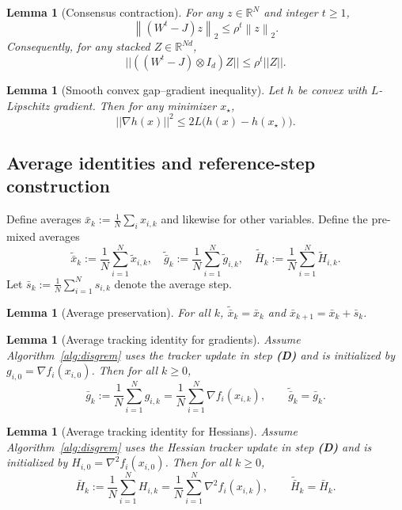 \documentclass[11pt,a4paper]{article}
\def\one{1}%
\def\J{J}%
\def\norm#1{||#1||}%
\newtheorem{lemma}[theorem]{Lemma}
\newcommand{\R}{\mathbb{R}}
\newcommand{\one}{\mathbf{1}}
\newcommand{\norm}[1]{\left\|#1\right\|}
\newcommand{\normtwo}[1]{\left\|#1\right\|_2}
\newcommand{\J}{\left(\frac{1}{N}\one\one^\top\right)}
\begin{document}
\begin{lemma}[Consensus contraction]\label{lem:consensus}
	For any $z\in\R^N$ and integer $t\ge 1$,
	\[
	\normtwo{(W^t-\J)z}\le \rho^t\normtwo{z}.
	\]
	Consequently, for any stacked $Z\in\R^{Nd}$,
	\[
	\norm{((W^t-\J)\otimes I_d)Z}\le \rho^t\norm{Z}.
	\]
\end{lemma}

\begin{lemma}[Smooth convex gap--gradient inequality]\label{lem:gap-grad}
	Let $h$ be convex with $L$-Lipschitz gradient. Then for any minimizer $x_\star$,
	\[
	\norm{\nabla h(x)}^2\le 2L\big(h(x)-h(x_\star)\big).
	\]
\end{lemma}

\subsection{Average identities and reference-step construction}
Define averages $\bar x_k:=\frac1N\sum_i x_{i,k}$ and likewise for other variables.
Define the pre-mixed averages
\[
\tilde{\bar x}_k:=\frac1N\sum_{i=1}^N\tilde x_{i,k},\quad
\tilde{\bar g}_k:=\frac1N\sum_{i=1}^N\tilde g_{i,k},\quad
\tilde{\bar H}_k:=\frac1N\sum_{i=1}^N\tilde H_{i,k}.
\]
Let $\bar s_k:=\frac1N\sum_{i=1}^N s_{i,k}$ denote the average step.

\begin{lemma}[Average preservation]\label{lem:avg-pres}
	For all $k$, $\tilde{\bar x}_k=\bar x_k$ and $\bar x_{k+1}=\bar x_k+\bar s_k$.
\end{lemma}

\begin{lemma}[Average tracking identity for gradients]\label{lem:avg-track}
	Assume Algorithm~\ref{alg:disgrem} uses the tracker update in step \textbf{(D)} and is initialized by
	$g_{i,0}=\nabla f_i(x_{i,0})$.
	Then for all $k\ge 0$,
	\[
	\bar g_k:=\frac1N\sum_{i=1}^N g_{i,k}=\frac1N\sum_{i=1}^N \nabla f_i(x_{i,k}),
	\qquad
	\tilde{\bar g}_k=\bar g_k.
	\]
\end{lemma}

\begin{lemma}[Average tracking identity for Hessians]\label{lem:avg-track-h}
	Assume Algorithm~\ref{alg:disgrem} uses the Hessian tracker update in step \textbf{(D)} and is initialized by
	$H_{i,0}=\nabla^2 f_i(x_{i,0})$.
	Then for all $k\ge 0$,
	\[
	\bar H_k:=\frac1N\sum_{i=1}^N H_{i,k}=\frac1N\sum_{i=1}^N \nabla^2 f_i(x_{i,k}),
	\qquad
	\tilde{\bar H}_k=\bar H_k.
	\]
\end{lemma}
\end{document}
